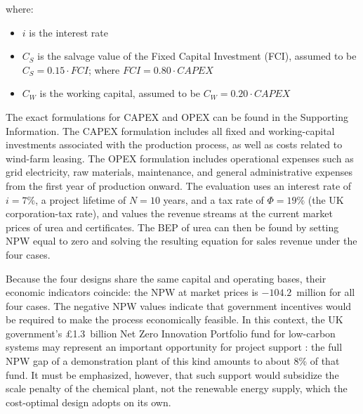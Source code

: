 \documentclass[letterpaper]{article}
\begin{document}
where:

\begin{itemize}
 \item $i$ is the interest rate
  \item $C_S$ is the salvage value of the Fixed Capital Investment
    (FCI), assumed to be $C_S = 0.15 \cdot FCI$; where
    $FCI = 0.80 \cdot CAPEX$
  \item $C_W$ is the working capital, assumed to be
    $C_W = 0.20 \cdot CAPEX$
\end{itemize}

The exact formulations for CAPEX and OPEX can be found in the
Supporting Information. The CAPEX formulation includes all fixed and
working-capital investments associated with the production process,
as well as costs related to wind-farm leasing. The OPEX formulation
includes operational expenses such as grid electricity, raw
materials, maintenance, and general administrative expenses from the
first year of production onward. The evaluation uses an interest
rate of $i = 7\%$, a project lifetime of $N = 10$ years, and a tax
rate of $\Phi = 19\%$ (the UK corporation-tax rate), and values the
revenue streams at the current market prices of urea and 
certificates. The BEP of urea can then be found by setting NPW equal
to zero and solving the resulting equation for sales revenue under
the four cases.

Because the four designs share the same capital and operating bases,
their economic indicators coincide: the NPW at market prices is
$-104.2$~million \textsterling{} for all four
cases. The negative NPW values indicate that government incentives
would be required to make the process economically feasible. In this
context, the UK government's \pounds 1.3~billion Net Zero Innovation
Portfolio fund for low-carbon systems may represent an important
opportunity for project support \cite{GovUKNZIP2025}: the full NPW
gap of a demonstration plant of this kind amounts to about 8\% of
that fund. It must be emphasized, however, that such support would
subsidize the scale penalty of the chemical plant, not the renewable
energy supply, which the cost-optimal design adopts on its own.
\end{document}
